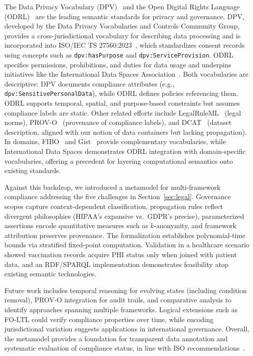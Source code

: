 \documentclass{IOS-Book-Article}
\begin{document}
The Data Privacy Vocabulary (DPV)~\cite{pandit2019dpv} and the Open Digital Rights Language (ODRL)~\cite{odrl-model-2018,odrl-vocab-2018} are the leading semantic standards for privacy and governance. DPV, developed by the Data Privacy Vocabularies and Controls Community Group, provides a cross-jurisdictional vocabulary for describing data processing and is incorporated into ISO/IEC TS 27560:2023~\cite{iso27560}, which standardizes consent records using concepts such as \texttt{dpv:hasPurpose} and \texttt{dpv:ServiceProvision}. ODRL specifies permissions, prohibitions, and duties for data usage and underpins initiatives like the International Data Spaces Association~\cite{bader2020}. Both vocabularies are descriptive: DPV documents compliance attributes (e.g., \texttt{dpv:SensitivePersonalData}), while ODRL defines policies referencing them. ODRL supports temporal, spatial, and purpose-based constraints but assumes compliance labels are static. Other related efforts include LegalRuleML~\cite{legalruleml} (legal norms), PROV-O~\cite{prov-o} (provenance of compliance labels), and DCAT~\cite{dcat} (dataset description, aligned with our notion of data containers but lacking propagation). In domains, FIBO~\cite{fibo} and Gist~\cite{gist} provide complementary vocabularies, while International Data Spaces demonstrates ODRL integration with domain-specific vocabularies, offering a precedent for layering computational semantics onto existing standards.  

Against this backdrop, we introduced a metamodel for multi-framework compliance addressing the five challenges in Section~\ref{sec:legal}. Governance scopes capture context-dependent classification, propagation rules reflect divergent philosophies (HIPAA’s expansive vs.\ GDPR’s precise), parameterized assertions encode quantitative measures such as $k$-anonymity, and framework attribution preserves provenance. The formalization establishes polynomial-time bounds via stratified fixed-point computation. Validation in a healthcare scenario showed vaccination records acquire PHI status only when joined with patient data, and an RDF/SPARQL implementation demonstrates feasibility atop existing semantic technologies.  

Future work includes temporal reasoning for evolving states (including condition removal), PROV-O integration for audit trails, and comparative analysis to identify approaches spanning multiple frameworks. Logical extensions such as FO-LTL could verify compliance properties over time, while encoding jurisdictional variation suggests applications in international governance. Overall, the metamodel provides a foundation for transparent data annotation and systematic evaluation of compliance status, in line with ISO recommendations~\cite{iso19944,iso38505,iso27001}.
\end{document}

